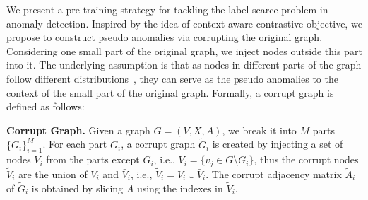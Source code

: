 We present a pre-training strategy for tackling the label scarce problem in anomaly detection. 
Inspired by the idea of context-aware contrastive objective, we propose to construct pseudo anomalies via corrupting the original graph. 
Considering one small part of the original graph, we inject nodes outside this part into it.  
The underlying assumption is that as nodes in different parts of the graph follow different distributions~\cite{qiu2020gcc, velickovic2019deep}, they can serve as the pseudo anomalies to the context of the small part of the original graph.   
Formally, a corrupt graph is defined as follows:

\begin{definition}
	\label{eq:corrupt}
	\textbf{Corrupt Graph.} 
	Given a graph $G=(V, X, A)$, we break it into $M$ parts $\{G_i\}_{i=1}^{M}$.  
	For each part $G_i$, a corrupt graph $\tilde{G}_i$ is created by injecting a set of nodes $\bar{V}_i $ from the parts except $G_i$, i.e., $\bar{V}_i = \{v_j \in G \setminus  G_i \}$, thus the corrupt nodes $\tilde{V}_i$ are the union of $V_i$ and $\bar{V}_i$, i.e., $\tilde{V}_i = V_i \cup \bar{V}_i$. 
	The corrupt adjacency matrix $\tilde{A}_i$ of $\tilde{G}_i$ is obtained by slicing $A$ using the indexes in $\tilde{V}_i$. 
\end{definition}




